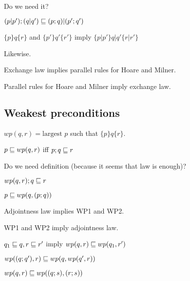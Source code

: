 \documentclass{article}
\begin{document}
Do we need it?

\begin{law}[Exchange]
$(p|p');(q|q') \sqsubseteq (p;q)|(p';q')$
\end{law}

\begin{rul}
$\{p\}q\{r\}$ and $\{p'\}q'\{r'\}$ imply $\{p|p'\} q|q' \{r|r'\}$
\end{rul}

\begin{rul}
Likewise.
\end{rul}

\begin{theorem}
Exchange law implies parallel rules for Hoare and Milner.
\end{theorem}

\begin{theorem}
Parallel rules for Hoare and Milner imply exchange law.
\end{theorem}


\subsection*{Weakest preconditions}

\begin{definition}
$wp(q, r) = \textrm{largest } p$ such that $\{p\}q\{r\}$.
\end{definition}

\begin{law}[adjointness]
$p\sqsubseteq wp(q, r)$ iff $p;q \sqsubseteq r$
\end{law}

Do we need  definition (because it seems that law is enough)?

\begin{rul}[WP1]
$wp(q, r); q \sqsubseteq r$
\end{rul}

\begin{rul}[WP2]
$p \sqsubseteq wp(q, (p;q))$
\end{rul}

\begin{theorem}
Adjointness law implies WP1 and WP2.
\end{theorem}

\begin{theorem}
WP1 and WP2 imply adjointness law.
\end{theorem}



\begin{theorem}[wp monotonicity]
$q_1 \sqsubseteq q, r \sqsubseteq r'$ imply $wp(q, r) \sqsubseteq wp(q_1, r')$
\end{theorem}

\begin{theorem}[stepwise wp]
$wp((q;q'), r) \sqsubseteq wp(q, wp(q', r))$
\end{theorem}

\begin{theorem}
$wp(q, r) \sqsubseteq wp((q;s), (r;s))$
\end{theorem}
\end{document}
